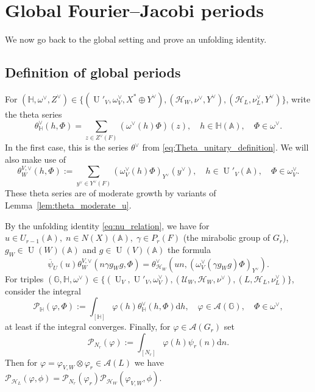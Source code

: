 \documentclass[letterpaper,11pt]{amsart}
\newcommand{\bA}{\mathbb{A}}
\newcommand{\bH}{\mathbb{H}}
\newcommand{\bG}{\mathbb{G}}
\newcommand{\cA}{\mathcal{A}}
\newcommand{\cH}{\mathcal{H}}
\newcommand{\cP}{\mathcal{P}}
\newcommand{\cU}{\mathcal{U}}
\newcommand{\rd}{\mathrm{d}}
\newcommand{\<}{\negthickspace}
\DeclareMathOperator{\U}{U}
\theoremstyle{definition}
\theoremstyle{plain}
\theoremstyle{remark}
\numberwithin{equation}{section}
\begin{document}
\section{Global Fourier--Jacobi periods}

\label{sec:global_FJ}

We now go back to the global setting and prove an unfolding identity.

\subsection{Definition of global periods}
\label{subsubsection:global_FJ_notations}
For $(\bH,\omega^\vee,Z^\vee) \in \{ (\U'_V,\omega^\vee_V,X^* \oplus Y^\vee), (\cH_W,\nu^\vee,Y^\vee),(\cH_L,\nu^\vee_L,Y^\vee)\}$, write the theta series
\begin{equation*}
    \theta^\vee_\bH(h,\Phi)=\sum_{z \in Z^\vee(F)} (\omega^\vee(h)\Phi)(z), \quad h \in \bH(\bA),  \quad \Phi \in \omega^\vee.
\end{equation*}
In the first case, this is the series $\theta^\vee$ from \eqref{eq:Theta_unitary_definition}. We will also make use of
\begin{equation*}
    \theta_W^{V,\vee}(h,\Phi):= \sum_{y^\vee \in  Y^\vee(F)} (\omega^\vee_{V}(h) \Phi)_{Y^\vee}(y^\vee), \quad h \in \U'_V(\bA), \quad \Phi \in \omega^\vee_V.
\end{equation*}
These theta series are of moderate growth by variants of Lemma~\ref{lem:theta_moderate_u}.

By the unfolding identity \eqref{eq:nu_relation}, we have for $u \in U_{r-1}(\bA), \; n \in N(X)(\bA), \; \gamma \in P_r(F)$ (the mirabolic group of $G_r$), $g_W \in \U(W)(\bA)$ and $g \in \U(V)(\bA)$ the formula 
\begin{equation}
\label{eq:theta_relation}
    \overline{\psi}_{U}(u)\theta_W^{V,\vee}(n \gamma g_Wg,\Phi)=\theta_{\cH_W}^{\vee}(un,(\omega^\vee_V(\gamma g_Wg)\Phi)_{Y^\vee}).
\end{equation}
For triples ${(\bG,\bH,\omega^\vee) \in \{(\U_V,\U'_V,\omega^\vee_V), (\cU_W,\cH_W,\nu^\vee),(L,\cH_L,\nu^\vee_L)\}}$, consider the integral
\begin{equation}
    \label{eq:global_period_defi}
    \cP_{\bH}(\varphi,\Phi):=\int_{[\bH]} \varphi(h) \theta_{\bH}^\vee(h,\Phi) \rd h, \quad \varphi \in \cA(\bG), \quad \Phi \in \omega^\vee,
\end{equation}
at least if the integral converges. Finally, for $\varphi \in \cA(G_r)$ set 
\begin{equation*}
        \cP_{N_r}(\varphi):= \int_{[N_r]} \varphi(h) \psi_r(n) \rd n.
\end{equation*}
Then for $\varphi=\varphi_{V,W} \otimes \varphi_{r} \in \cA(L)$ we have $ \cP_{\cH_L}(\varphi , \phi)=\cP_{N_r}(\varphi_r)\cP_{\cH_W}(\varphi_{V,W}, \phi)$.
\end{document}
